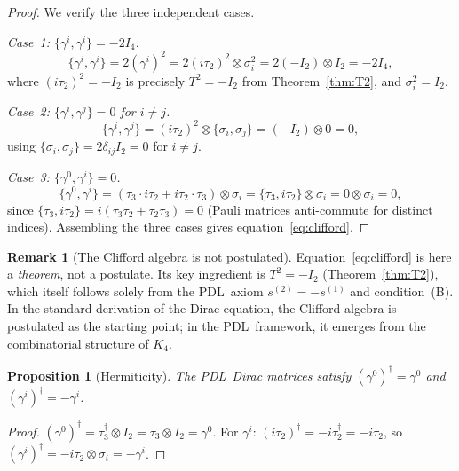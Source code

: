 \documentclass[11pt,a4paper]{article}
\newtheorem{proposition}[theorem]{Proposition}
\theoremstyle{definition}
\newtheorem{remark}[theorem]{Remark}
\newcommand{\PDL}{\textnormal{PDL}}
\newcommand{\Kfour}{K_4}
\begin{document}
\begin{proof}
We verify the three independent cases.

\smallskip\noindent\emph{Case~1: $\{\gamma^i, \gamma^i\} = -2I_4$.}
\begin{equation}
\{\gamma^i, \gamma^i\} = 2(\gamma^i)^2 = 2(i\tau_2)^2 \otimes \sigma_i^2 = 2(-I_2) \otimes I_2 = -2I_4,
\end{equation}
where $(i\tau_2)^2 = -I_2$ is precisely $T^2 = -I_2$ from Theorem~\ref{thm:T2}, and $\sigma_i^2 = I_2$.

\smallskip\noindent\emph{Case~2: $\{\gamma^i, \gamma^j\} = 0$ for $i \neq j$.}
\begin{equation}
\{\gamma^i, \gamma^j\} = (i\tau_2)^2 \otimes \{\sigma_i, \sigma_j\} = (-I_2) \otimes 0 = 0,
\end{equation}
using $\{\sigma_i, \sigma_j\} = 2\delta_{ij}I_2 = 0$ for $i \neq j$.

\smallskip\noindent\emph{Case~3: $\{\gamma^0, \gamma^i\} = 0$.}
\begin{equation}
\{\gamma^0, \gamma^i\} = (\tau_3 \cdot i\tau_2 + i\tau_2 \cdot \tau_3) \otimes \sigma_i = \{\tau_3, i\tau_2\} \otimes \sigma_i = 0 \otimes \sigma_i = 0,
\end{equation}
since $\{\tau_3, i\tau_2\} = i(\tau_3\tau_2 + \tau_2\tau_3) = 0$ (Pauli matrices anti-commute for distinct indices). Assembling the three cases gives equation~\eqref{eq:clifford}.
\end{proof}

\begin{remark}[The Clifford algebra is not postulated]
Equation~\eqref{eq:clifford} is here a \emph{theorem}, not a postulate. Its key ingredient is $T^2 = -I_2$ (Theorem~\ref{thm:T2}), which itself follows solely from the \PDL\ axiom $s^{(2)} = -s^{(1)}$ and condition~(B). In the standard derivation of the Dirac equation, the Clifford algebra is postulated as the starting point; in the \PDL\ framework, it emerges from the combinatorial structure of $\Kfour$.
\end{remark}

\begin{proposition}[Hermiticity]
\label{prop:hermiticity}
The \PDL\ Dirac matrices satisfy $(\gamma^0)^\dagger = \gamma^0$ and $(\gamma^i)^\dagger = -\gamma^i$.
\end{proposition}

\begin{proof}
$(\gamma^0)^\dagger = \tau_3^\dagger \otimes I_2 = \tau_3 \otimes I_2 = \gamma^0$. For $\gamma^i$: $(i\tau_2)^\dagger = -i\tau_2^\dagger = -i\tau_2$, so $(\gamma^i)^\dagger = -i\tau_2 \otimes \sigma_i = -\gamma^i$.
\end{proof}
\end{document}
